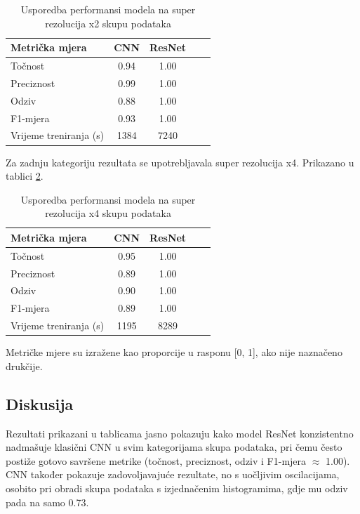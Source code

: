\documentclass[a4paper,twocolumn]{article}
\begin{document}
\begin{table}[h!]
\centering
\begin{tabular}{@{}lcccc@{}}
\toprule
Metrička mjera & CNN & ResNet \\
\midrule
Točnost & 0.94 & 1.00 \\
Preciznost & 0.99 & 1.00 \\
Odziv & 0.88 & 1.00 \\
F1-mjera & 0.93 & 1.00 \\
Vrijeme treniranja (s) & 1384 & 7240  \\
\bottomrule
\end{tabular}
\caption{Usporedba performansi modela na super rezolucija x2 skupu podataka}
\label{tab:rezultati_superx2}
\end{table}

Za zadnju kategoriju rezultata se upotrebljavala super rezolucija x4. Prikazano u tablici \ref{tab:rezultati_superx4}.

\begin{table}[h!]
\centering
\begin{tabular}{@{}lcccc@{}}
\toprule
Metrička mjera & CNN & ResNet \\
\midrule
Točnost & 0.95 & 1.00 \\
Preciznost & 0.89 & 1.00 \\
Odziv & 0.90 & 1.00 \\
F1-mjera & 0.89 & 1.00 \\
Vrijeme treniranja (s) & 1195 & 8289  \\
\bottomrule
\end{tabular}
\caption{Usporedba performansi modela na super rezolucija x4 skupu podataka}
\label{tab:rezultati_superx4}
\end{table}

Metričke mjere su izražene kao proporcije u rasponu [0, 1], ako nije naznačeno drukčije.

\subsection{Diskusija}

Rezultati prikazani u tablicama jasno pokazuju kako model ResNet konzistentno nadmašuje klasični CNN u svim kategorijama skupa podataka, pri čemu često postiže gotovo savršene metrike (točnost, preciznost, odziv i F1-mjera $\approx$ 1.00). CNN također pokazuje zadovoljavajuće rezultate, no s uočljivim oscilacijama, osobito pri obradi skupa podataka s izjednačenim histogramima, gdje mu odziv pada na samo 0.73.
\end{document}
